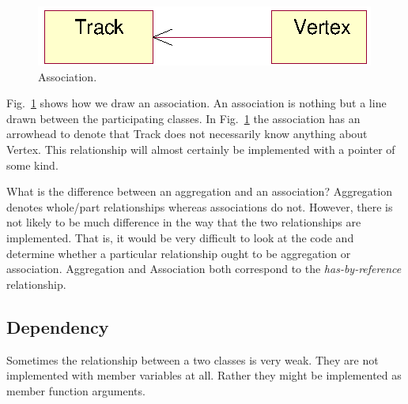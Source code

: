 \begin{Entry}
\begin{Entry}
\begin{figure}[htb]
    \begin{center}
        \includegraphics{umlAssociation.eps}
        \caption{Association.}
        \label{fig:umlAssociation}
    \end{center}
\end{figure}

Fig.~\ref{fig:umlAssociation} shows how we draw an association.  An
association is nothing but a line drawn between the participating
classes. In Fig.~\ref{fig:umlAssociation} the association has an
arrowhead to denote that Track does not necessarily know anything
about Vertex. This relationship will almost certainly be implemented
with a pointer of some kind.

What is the difference between an aggregation and an association?
Aggregation denotes whole/part relationships whereas associations do
not. However, there is not likely to be much difference in the way
that the two relationships are implemented.  That is, it would be very
difficult to look at the code and determine whether a particular
relationship ought to be aggregation or association.  Aggregation and
Association both correspond to the \emph{has-by-reference}
relationship.

\subsection{Dependency}

Sometimes the relationship between a two classes is very weak. They
are not implemented with member variables at all. Rather they might be
implemented as member function arguments.


\end{Entry}
\end{Entry}
